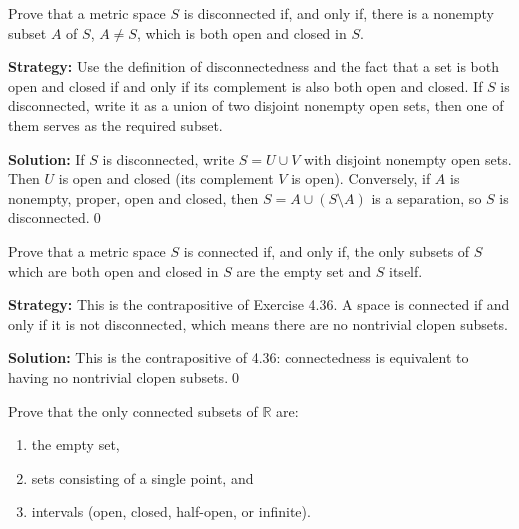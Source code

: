 \begin{problembox}
\begin{problemstatement}
Prove that a metric space $S$ is disconnected if, and only if, there is a nonempty subset $A$ of $S$, $A \neq S$, which is both open and closed in $S$.
\end{problemstatement}
\end{problembox}

\noindent\textbf{Strategy:} Use the definition of disconnectedness and the fact that a set is both open and closed if and only if its complement is also both open and closed. If $S$ is disconnected, write it as a union of two disjoint nonempty open sets, then one of them serves as the required subset.

\bigskip\noindent\textbf{Solution:}
If $S$ is disconnected, write $S=U\cup V$ with disjoint nonempty open sets. Then $U$ is open and closed (its complement $V$ is open). Conversely, if $A$ is nonempty, proper, open and closed, then $S=A\cup(S\setminus A)$ is a separation, so $S$ is disconnected.\qed



\begin{problembox}
\begin{problemstatement}
Prove that a metric space $S$ is connected if, and only if, the only subsets of $S$ which are both open and closed in $S$ are the empty set and $S$ itself.
\end{problemstatement}
\end{problembox}

\noindent\textbf{Strategy:} This is the contrapositive of Exercise 4.36. A space is connected if and only if it is not disconnected, which means there are no nontrivial clopen subsets.

\bigskip\noindent\textbf{Solution:}
This is the contrapositive of 4.36: connectedness is equivalent to having no nontrivial clopen subsets.\qed



\begin{problembox}
\begin{problemstatement}
Prove that the only connected subsets of $\mathbb{R}$ are:
\begin{enumerate}[label=(\alph*)]
\item the empty set,
\item sets consisting of a single point, and
\item intervals (open, closed, half-open, or infinite).
\end{enumerate}
\end{problemstatement}
\end{problembox}

